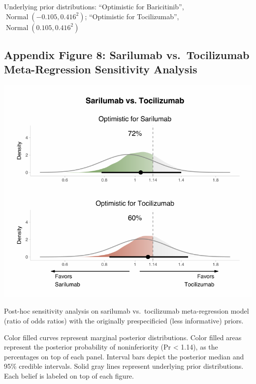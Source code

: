 \documentclass[
  12pt,
]{article}
\begin{document}
Underlying prior distributions: ``Optimistic for Baricitinib'',
\(\operatorname{Normal}(-0.105, 0.416^2)\); ``Optimistic for
Tocilizumab'', \(\operatorname{Normal}(0.105, 0.416^2)\)

\newpage

\hypertarget{appendix-figure-8-sarilumab-vs.-tocilizumab-meta-regression-sensitivity-analysis}{%
\subsection{Appendix Figure 8: Sarilumab vs.~Tocilizumab Meta-Regression
Sensitivity
Analysis}\label{appendix-figure-8-sarilumab-vs.-tocilizumab-meta-regression-sensitivity-analysis}}

\begin{center}\includegraphics{supplementary_material_files/figure-latex/meta regressions sensitivity plot sari display-1} \end{center}

Post-hoc sensitivity analysis on sarilumab vs.~tocilizumab
meta-regression model (ratio of odds ratios) with the originally
prespecificied (less informative) priors.

Color filled curves represent marginal posterior distributions. Color
filled areas represent the posterior probability of noninferiority (Pr
\textless{} 1.14), as the percentages on top of each panel. Interval
bars depict the posterior median and 95\% credible intervals. Solid gray
lines represent underlying prior distributions. Each belief is labeled
on top of each figure.
\end{document}
